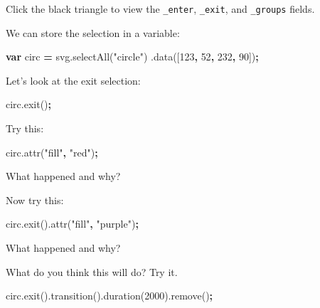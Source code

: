 \documentclass[openany]{book}
\newenvironment{Shaded}{\begin{snugshade}}{\end{snugshade}}
\newcommand{\AttributeTok}[1]{\textcolor[rgb]{0.77,0.63,0.00}{#1}}
\newcommand{\DecValTok}[1]{\textcolor[rgb]{0.00,0.00,0.81}{#1}}
\newcommand{\KeywordTok}[1]{\textcolor[rgb]{0.13,0.29,0.53}{\textbf{#1}}}
\newcommand{\NormalTok}[1]{#1}
\newcommand{\OperatorTok}[1]{\textcolor[rgb]{0.81,0.36,0.00}{\textbf{#1}}}
\newcommand{\StringTok}[1]{\textcolor[rgb]{0.31,0.60,0.02}{#1}}
\newcommand{\VariableTok}[1]{\textcolor[rgb]{0.00,0.00,0.00}{#1}}
\begin{document}
Click the black triangle to view the \texttt{\_enter}, \texttt{\_exit}, and \texttt{\_groups} fields.

We can store the selection in a variable:

\begin{Shaded}
\begin{Highlighting}[]
\KeywordTok{var}\NormalTok{ circ }\OperatorTok{=} \VariableTok{svg}\NormalTok{.}\AttributeTok{selectAll}\NormalTok{(}\StringTok{"circle"}\NormalTok{)}
\NormalTok{    .}\AttributeTok{data}\NormalTok{([}\DecValTok{123}\OperatorTok{,} \DecValTok{52}\OperatorTok{,} \DecValTok{232}\OperatorTok{,} \DecValTok{90}\NormalTok{])}\OperatorTok{;}
\end{Highlighting}
\end{Shaded}

Let's look at the exit selection:

\begin{Shaded}
\begin{Highlighting}[]
\VariableTok{circ}\NormalTok{.}\AttributeTok{exit}\NormalTok{()}\OperatorTok{;}
\end{Highlighting}
\end{Shaded}

Try this:

\begin{Shaded}
\begin{Highlighting}[]
\VariableTok{circ}\NormalTok{.}\AttributeTok{attr}\NormalTok{(}\StringTok{"fill"}\OperatorTok{,} \StringTok{"red"}\NormalTok{)}\OperatorTok{;}
\end{Highlighting}
\end{Shaded}

What happened and why?

Now try this:

\begin{Shaded}
\begin{Highlighting}[]
\VariableTok{circ}\NormalTok{.}\AttributeTok{exit}\NormalTok{().}\AttributeTok{attr}\NormalTok{(}\StringTok{"fill"}\OperatorTok{,} \StringTok{"purple"}\NormalTok{)}\OperatorTok{;}
\end{Highlighting}
\end{Shaded}

What happened and why?

What do you think this will do? Try it.

\begin{Shaded}
\begin{Highlighting}[]
\VariableTok{circ}\NormalTok{.}\AttributeTok{exit}\NormalTok{().}\AttributeTok{transition}\NormalTok{().}\AttributeTok{duration}\NormalTok{(}\DecValTok{2000}\NormalTok{).}\AttributeTok{remove}\NormalTok{()}\OperatorTok{;}
\end{Highlighting}
\end{Shaded}
\end{document}
